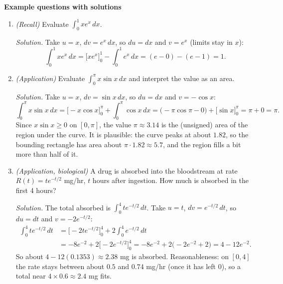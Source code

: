 \documentclass[11pt]{article}
\begin{document}
\textbf{Example questions with solutions}
\begin{enumerate}
\item \emph{(Recall)} Evaluate $\displaystyle\int_0^1 xe^x\,dx$.

\textit{Solution.} Take $u=x$, $dv=e^x\,dx$, so $du=dx$ and $v=e^x$ (limits stay in $x$):
\[ \int_0^1xe^x\,dx = \big[xe^x\big]_0^1 - \int_0^1e^x\,dx = (e - 0) - (e-1) = 1. \]

\item \emph{(Application)} Evaluate $\displaystyle\int_0^{\pi}x\sin x\,dx$ and interpret the value as an area.

\textit{Solution.} Take $u=x$, $dv=\sin x\,dx$, so $du=dx$ and $v=-\cos x$:
\[ \int_0^\pi x\sin x\,dx = \big[-x\cos x\big]_0^\pi + \int_0^\pi\cos x\,dx = \big(-\pi\cos\pi - 0\big) + \big[\sin x\big]_0^\pi = \pi + 0 = \pi. \]
Since $x\sin x\ge0$ on $[0,\pi]$, the value $\pi\approx3.14$ is the (unsigned) area of the region under the curve. It is plausible: the curve peaks at about $1.82$, so the bounding rectangle has area about $\pi\cdot1.82\approx5.7$, and the region fills a bit more than half of it.

\item \emph{(Application, biological)} A drug is absorbed into the bloodstream at rate $R(t)=te^{-t/2}$ mg/hr, $t$ hours after ingestion. How much is absorbed in the first 4 hours?

\textit{Solution.} The total absorbed is $\int_0^4te^{-t/2}\,dt$. Take $u=t$, $dv=e^{-t/2}\,dt$, so $du=dt$ and $v=-2e^{-t/2}$:
\begin{align*}
\int_0^4te^{-t/2}\,dt &= \big[-2te^{-t/2}\big]_0^4 + 2\int_0^4e^{-t/2}\,dt \\
&= -8e^{-2} + 2\big[-2e^{-t/2}\big]_0^4 = -8e^{-2} + 2\big(-2e^{-2}+2\big) = 4 - 12e^{-2}.
\end{align*}
So about $4-12(0.1353)\approx 2.38$ mg is absorbed. Reasonableness: on $[0,4]$ the rate stays between about $0.5$ and $0.74$ mg/hr (once it has left $0$), so a total near $4\times0.6\approx2.4$ mg fits.
\end{enumerate}
\end{document}
